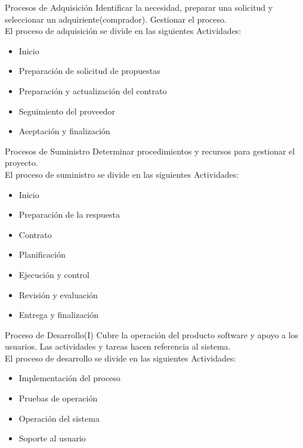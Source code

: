 \documentclass{beamer}
\begin{document}
			\begin{frame}{Procesos de Adquisición}
				Identificar la necesidad, preparar una solicitud y seleccionar un adquiriente(comprador). Gestionar el proceso.\\
				
				El proceso de adquisición se divide en las siguientes Actividades:
				\begin{itemize}
					\item Inicio
					\item Preparación de solicitud de propuestas
					\item Preparación y actualización del contrato
					\item Seguimiento del proveedor
					\item Aceptación y finalización
				\end{itemize}
			\end{frame}
			
			\begin{frame}{Procesos de Suministro}
				Determinar procedimientos y recursos para gestionar el proyecto.\\
				
				El proceso de suministro se divide en las siguientes Actividades:
				\begin{itemize}
					\item Inicio
					\item Preparación de la respuesta
					\item Contrato
					\item Planificación
					\item Ejecución y control
					\item Revisión y evaluación
					\item Entrega y finalización
				\end{itemize}
			\end{frame}
			
			\begin{frame}{Proceso de Desarrollo(I)}
				Cubre la operación del producto software y apoyo a los usuarios. Las actividades y tareas hacen referencia al sistema.\\
				El proceso de desarrollo se divide en las siguientes Actividades:
				\begin{itemize}
					\item Implementación del proceso
					\item Pruebas de operación
					\item Operación del sistema
					\item Soporte al usuario
				\end{itemize}
			\end{frame}
			
\end{document}
